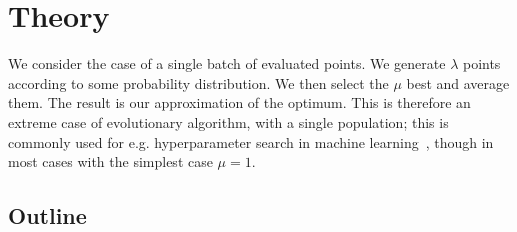 \section{Theory}
We consider the case of a single batch of evaluated points. We generate $\lambda$ points according to some probability distribution. We then select the $\mu$ best and average them. The result is our approximation of the optimum. This is therefore an extreme case of evolutionary algorithm, with a single population; this is commonly used for e.g. hyperparameter search in machine learning~\cite{bergstra,bousquet}, though in most cases with the simplest case $\mu=1$.
\subsection{Outline}

